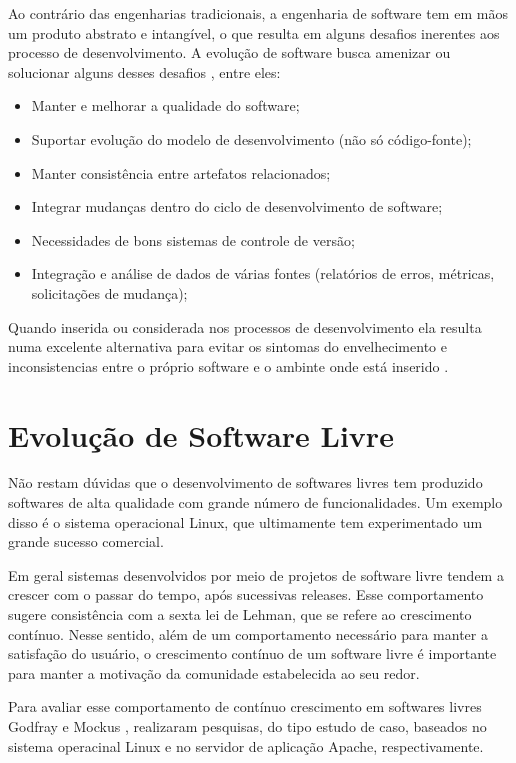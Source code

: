 Ao contrário das engenharias tradicionais, a engenharia de software tem em mãos um produto abstrato e intangível, o que resulta em alguns desafios inerentes aos processo de desenvolvimento. A evolução de software busca amenizar ou solucionar alguns desses desafios \cite{mens2005challenges}, entre eles:

\begin{itemize}
\item Manter e melhorar a qualidade do software;
\item Suportar evolução do modelo de desenvolvimento (não só código-fonte);
\item Manter consistência entre artefatos relacionados;
\item Integrar mudanças dentro do ciclo de desenvolvimento de software;
\item Necessidades de bons sistemas de controle de versão;
\item Integração e análise de dados de várias fontes (relatórios de erros, métricas, solicitações de mudança);
\end{itemize}

Quando inserida ou considerada nos processos de desenvolvimento ela resulta numa excelente alternativa para evitar os sintomas do envelhecimento e inconsistencias entre o próprio software e o ambinte onde está inserido \cite{mens2005challenges}.

\section{Evolução de Software Livre}

Não restam dúvidas que o desenvolvimento de softwares livres tem produzido softwares de alta qualidade com grande número de funcionalidades. Um exemplo disso é o sistema operacional Linux, que ultimamente tem experimentado um grande sucesso comercial.

Em geral sistemas desenvolvidos por meio de projetos de software livre tendem a crescer com o passar do tempo, após sucessivas releases. Esse comportamento sugere consistência com a sexta lei de Lehman, que se refere ao crescimento contínuo. Nesse sentido, além de um comportamento necessário para manter a satisfação do usuário, o crescimento contínuo de um software livre é importante para manter a motivação da comunidade estabelecida ao seu redor.

Para avaliar esse comportamento de contínuo crescimento em softwares livres Godfray \cite{godfrey2000evolution} e Mockus \cite{mockus2000case}, realizaram pesquisas, do tipo estudo de caso, baseados no sistema operacinal Linux e no servidor de aplicação Apache, respectivamente.

